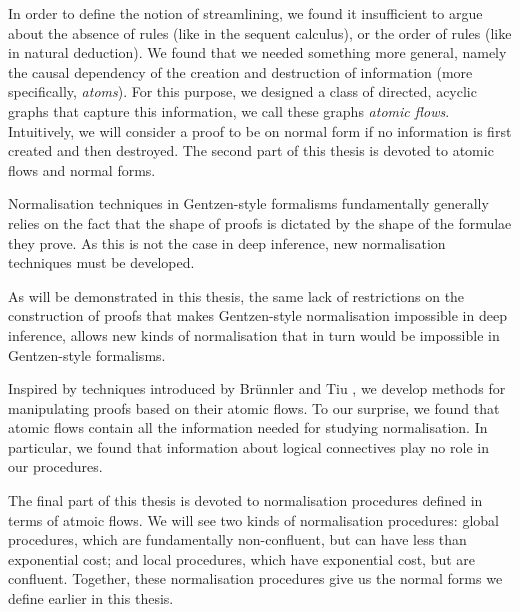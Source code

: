 In order to define the notion of streamlining, we found it insufficient to argue
about the absence of rules (like in the sequent calculus), or the order of rules
(like in natural deduction). We found that we needed something more
general, namely the causal dependency of the creation and destruction of
information (more specifically, \emph{atoms}). For this purpose, we designed a
class of directed, acyclic graphs that capture this information, we call these
graphs \emph{atomic flows}. Intuitively, we will consider a proof to be on
normal form if no information is first created and then destroyed. The second
part of this thesis is devoted to atomic flows and normal forms.

Normalisation techniques in Gentzen-style formalisms fundamentally
generally relies on the fact that the shape of proofs is dictated by
the shape of the formulae they prove. As this is not the case in deep
inference, new normalisation techniques must be developed.

As will be demonstrated in this thesis, the same lack of restrictions on the
construction of proofs that makes Gentzen-style normalisation impossible in deep
inference, allows new kinds of normalisation that in turn would be impossible
in Gentzen-style formalisms.

Inspired by techniques introduced by Br\"unnler and Tiu
\cite{Brun:04:Deep-Inf:rq}, we develop methods for manipulating proofs based
on their atomic flows. To our surprise, we found that atomic flows contain
all the information needed for studying normalisation. In particular, we found
that information about logical connectives play no role in our procedures.

The final part of this thesis is devoted to normalisation procedures defined in
terms of atmoic flows. We will see two kinds of normalisation procedures:
global procedures, which are fundamentally non-confluent, but can have less
than exponential cost; and local procedures, which have exponential cost, but
are confluent. Together, these normalisation procedures give us the normal forms
we define earlier in this thesis.

